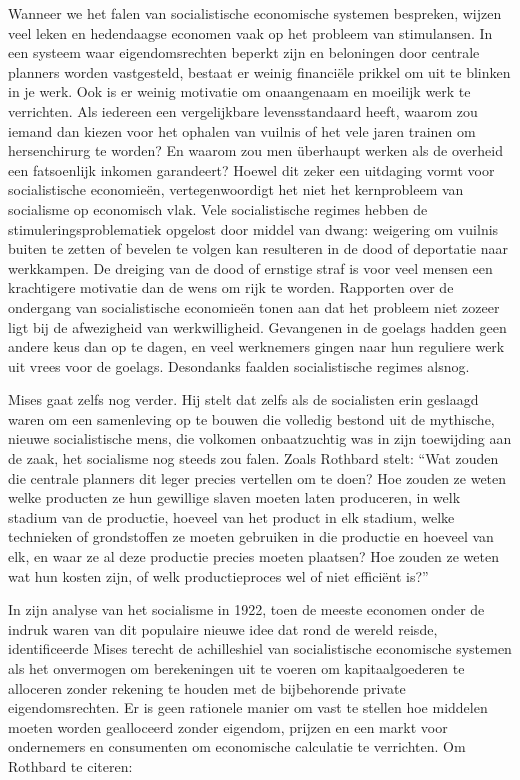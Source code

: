Wanneer we het falen van socialistische economische systemen bespreken, wijzen veel leken en hedendaagse economen vaak op het probleem van stimulansen. In een systeem waar eigendomsrechten beperkt zijn en beloningen door centrale planners worden vastgesteld, bestaat er weinig financiële prikkel om uit te blinken in je werk. Ook is er weinig motivatie om onaangenaam en moeilijk werk te verrichten. Als iedereen een vergelijkbare levensstandaard heeft, waarom zou iemand dan kiezen voor het ophalen van vuilnis of het vele jaren trainen om hersenchirurg te worden? En waarom zou men überhaupt werken als de overheid een fatsoenlijk inkomen garandeert? Hoewel dit zeker een uitdaging vormt voor socialistische economieën, vertegenwoordigt het niet het kernprobleem van socialisme op economisch vlak. Vele socialistische regimes hebben de stimuleringsproblematiek opgelost door middel van dwang: weigering om vuilnis buiten te zetten of bevelen te volgen kan resulteren in de dood of deportatie naar werkkampen. De dreiging van de dood of ernstige straf is voor veel mensen een krachtigere motivatie dan de wens om rijk te worden. Rapporten over de ondergang van socialistische economieën tonen aan dat het probleem niet zozeer ligt bij de afwezigheid van werkwilligheid. Gevangenen in de goelags hadden geen andere keus dan op te dagen, en veel werknemers gingen naar hun reguliere werk uit vrees voor de goelags. Desondanks faalden socialistische regimes alsnog.

Mises gaat zelfs nog verder. Hij stelt dat zelfs als de socialisten erin geslaagd waren om een samenleving op te bouwen die volledig bestond uit de mythische, nieuwe socialistische mens, die volkomen onbaatzuchtig was in zijn toewijding aan de zaak, het socialisme nog steeds zou falen. Zoals Rothbard stelt: ``Wat zouden die centrale planners dit leger precies vertellen om te doen? Hoe zouden ze weten welke producten ze hun gewillige slaven moeten laten produceren, in welk stadium van de productie, hoeveel van het product in elk stadium, welke technieken of grondstoffen ze moeten gebruiken in die productie en hoeveel van elk, en waar ze al deze productie precies moeten plaatsen? Hoe zouden ze weten wat hun kosten zijn, of welk productieproces wel of niet efficiënt is?''\autocite{137}

In zijn analyse van het socialisme in 1922, toen de meeste economen onder de indruk waren van dit populaire nieuwe idee dat rond de wereld reisde, identificeerde Mises terecht de achilleshiel van socialistische economische systemen als het onvermogen om berekeningen uit te voeren om kapitaalgoederen te alloceren zonder rekening te houden met de bijbehorende private eigendomsrechten. Er is geen rationele manier om vast te stellen hoe middelen moeten worden gealloceerd zonder eigendom, prijzen en een markt voor ondernemers en consumenten om economische calculatie te verrichten. Om Rothbard te citeren:


